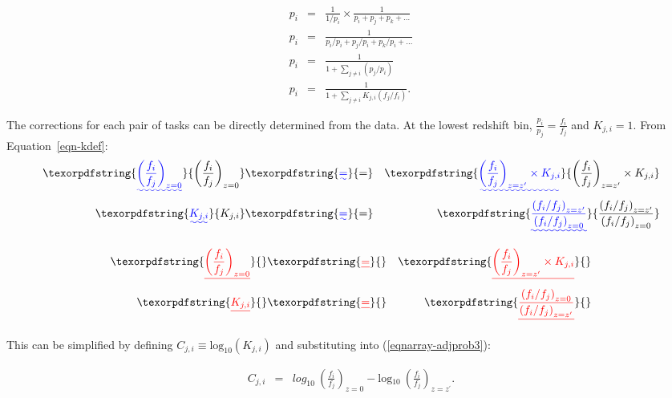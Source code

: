 \documentclass[useAMS,usenatbib]{mn2e}
\providecommand{\DIFaddtex}[1]{{\protect\color{blue}\uwave{#1}}} %
\providecommand{\DIFdeltex}[1]{{\protect\color{red}\sout{#1}}}                      %
\providecommand{\DIFaddbegin}{} %
\providecommand{\DIFaddend}{} %
\providecommand{\DIFdelbegin}{} %
\providecommand{\DIFdelend}{} %
\providecommand{\DIFadd}[1]{\texorpdfstring{\DIFaddtex{#1}}{#1}} %
\providecommand{\DIFdel}[1]{\texorpdfstring{\DIFdeltex{#1}}{}} %
\begin{document}
\DIFdelend \begin{eqnarray}
p_i &=& \frac{1}{1/p_i} \times \frac{1}{p_i + p_j + p_k + \dots} \\
p_i &=& \frac{1}{p_i/p_i + p_j/p_i + p_k/p_i + \dots} \\
p_i &=& \frac{1}{1 + \sum\limits_{j\ne i}{(p_j/p_i)}} \\
p_i &=& \frac{1}{1 + \sum\limits_{j\ne i}{K_{j,i} (f_j/f_i)}}.
\label{eqnarray-adjprob2}
\end{eqnarray}

The corrections for each pair of tasks can be directly determined from the data. At the lowest redshift bin, $\frac{p_i}{p_j} = \frac{f_i}{f_j}$ and $K_{j,i}=1$. From Equation~\ref{eqn-kdef}:
\DIFaddbegin \begin{eqnarray}\DIFadd{
\left(\frac{f_i}{f_j}\right)_{z=0} }&\DIFadd{=}& \DIFadd{\left(\frac{f_i}{f_j}\right)_{z=z^\prime}\times K_{j,i} }\\
\DIFadd{K_{j,i} }&\DIFadd{=}& \DIFadd{\frac{\left(f_i/f_j\right)_{z=z^\prime} }{ \left(f_i/f_j\right)_{z=0}}
\label{eqnarray-adjprob3}
}\end{eqnarray}
\DIFaddend 

\DIFdelbegin \begin{align*}\DIFdel{
\left(\frac{f_i}{f_j}\right)_{z=0} }&\DIFdel{=}& \DIFdel{\left(\frac{f_i}{f_j}\right)_{z=z^\prime}\times K_{j,i} }\\
\DIFdel{K_{j,i} }&\DIFdel{=}& \DIFdel{\frac{\left(f_i/f_j\right)_{z=0} }{ \left(f_i/f_j\right)_{z=z^\prime}}
\label{eqnarray-adjprob3}
}\end{align*}

\DIFdelend This can be simplified by defining $C_{j,i}\equiv\text{log}_{10}(K_{j,i})$ and substituting into (\ref{eqnarray-adjprob3}):
\DIFdelbegin %

\DIFdelend \begin{eqnarray}
C_{j,i} &=& \text{$log_{10}$}~\left(\frac{f_i}{f_j}\right)_{z=0} - \text{log$_{10}$}~\left(\frac{f_i}{f_j}\right)_{z=z^\prime}.
\label{eqnarray-adjprob4}
\end{eqnarray}
\end{document}
